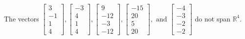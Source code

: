 \begin{exercise}
\begin{exerciseStatement}
  \end{exerciseStatement}
  \begin{exerciseAnswer}
   The vectors \(\left[\begin{array}{r}
3 \\
-1 \\
1 \\
4
\end{array}\right] , \left[\begin{array}{r}
-3 \\
4 \\
1 \\
4
\end{array}\right] , \left[\begin{array}{r}
9 \\
-12 \\
-3 \\
-12
\end{array}\right] , \left[\begin{array}{r}
-15 \\
20 \\
5 \\
20
\end{array}\right] , \text{ and } \left[\begin{array}{r}
-4 \\
-3 \\
-2 \\
-2
\end{array}\right]\) 
  	 do not  
	span \(\mathbb{R}^4\).
  


  \end{exerciseAnswer}
\end{exercise}
